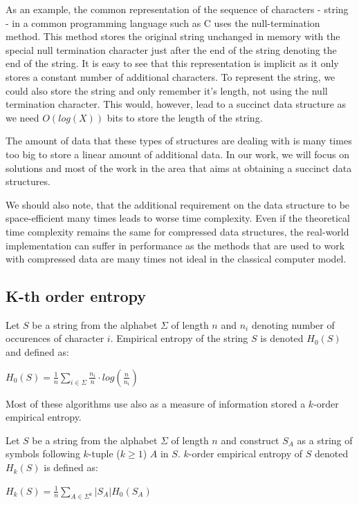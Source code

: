 As an example, the common representation of the sequence of characters - string - in a common programming language such as C uses the null-termination method. This method stores the original string unchanged in memory with the special null termination character just after the end of the string denoting the end of the string. It is easy to see that this representation is implicit as it only stores a constant number of additional characters. To represent the string, we could also store the string and only remember it's length, not using the null termination character. This would, however, lead to a succinct data structure as we need $O(log(X))$ bits to store the length of the string.

The amount of data that these types of structures are dealing with is many times too big to store a linear amount of additional data. In our work, we will focus on solutions and most of the work in the area that aims at obtaining a succinct data structures.

We should also note, that the additional requirement on the data structure to be space-efficient many times leads to worse time complexity. Even if the theoretical time complexity remains the same for compressed data structures, the real-world implementation can suffer in performance as the methods that are used to work with compressed data are many times not ideal in the classical computer model.

\subsection{K-th order entropy}

\begin{theorem}
Let $S$ be a string from the alphabet $\Sigma$ of length $n$ and $n_i$ denoting number of occurences of character
$i$. Empirical entropy of the string $S$ is denoted $H_0(S)$ and defined as:
\begin{center}
$H_0(S) = \frac{1}{n} \sum_{i \in \Sigma} \frac{n_i}{n}\cdot log(\frac{n}{n_i})$
\end{center}
\end{theorem}

Most of these algorithms use also as a measure of information stored a $k$-order empirical entropy.

\begin{theorem}
Let $S$ be a string from the alphabet $\Sigma$ of length $n$ and construct $S_A$ as a string of symbols following $k$-tuple ($k \geq 1$) $A$ in $S$.
$k$-order empirical entropy of $S$ denoted $H_k(S)$ is defined as:
\begin{center}
$H_k(S) = \frac{1}{n} \sum_{A \in \Sigma^k} |S_A| H_0(S_A)$
\end{center}
\end{theorem}


